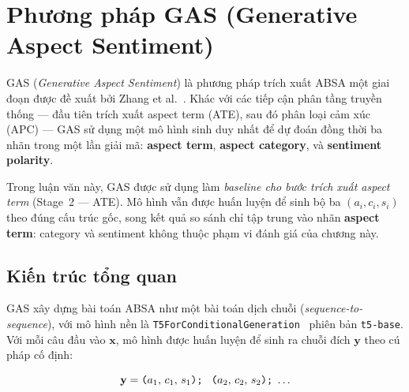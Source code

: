 
\section{Phương pháp GAS (Generative Aspect Sentiment)}
\label{sec:gas}

GAS (\textit{Generative Aspect Sentiment}) là phương pháp trích xuất
ABSA một giai đoạn được đề xuất bởi Zhang et al.~\cite{zhang2021gas}.
Khác với các tiếp cận phân tầng truyền thống — đầu tiên trích xuất
aspect term (ATE), sau đó phân loại cảm xúc (APC) — GAS sử dụng một
mô hình sinh duy nhất để dự đoán đồng thời ba nhãn trong một lần giải
mã:
\textbf{aspect term}, \textbf{aspect category}, và
\textbf{sentiment polarity}.

Trong luận văn này, GAS được sử dụng làm \textit{baseline cho bước
trích xuất aspect term} (Stage~2 — ATE).  Mô hình vẫn được huấn luyện
để sinh bộ ba $(a_i, c_i, s_i)$ theo đúng cấu trúc gốc, song kết quả
so sánh chỉ tập trung vào nhãn \textbf{aspect term}: category và
sentiment không thuộc phạm vi đánh giá của chương này.

\subsection{Kiến trúc tổng quan}
\label{subsec:gas_arch}

GAS xây dựng bài toán ABSA như một bài toán dịch chuỗi
(\textit{sequence-to-sequence}), với mô hình nền là
\texttt{T5ForConditionalGeneration}~\cite{raffel2020t5} phiên bản
\texttt{t5-base}.  Với mỗi câu đầu vào $\mathbf{x}$, mô hình được
huấn luyện để sinh ra chuỗi đích $\mathbf{y}$ theo cú pháp cố định:

\begin{equation}
  \mathbf{y} = \texttt{(}a_1,\, c_1,\, s_1\texttt{);\;
               (}a_2,\, c_2,\, s_2\texttt{);\;} \dots
  \label{eq:gas_format}
\end{equation}

